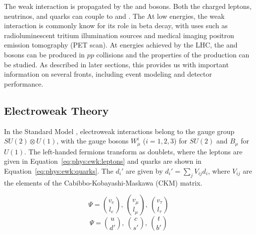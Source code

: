 The weak interaction is propagated by the \W and \Z bosons. Both the charged leptons, neutrinos, and quarks can couple to \W and \Z.  The At low energies, the weak interaction is commonly know for its role in beta decay, with uses such as radioluminescent tritium illumination sources and medical imaging positron emission tomography (PET scan).  At energies achieved by the LHC, the \W and \Z bosons can be produced in $pp$ collisions and the properties of the production can be studied. As described in later sections, this provides us with important information on several fronts, including event modeling and detector performance.


\subsection{Electroweak Theory}\label{ch:sm:ewk}
In the Standard Model \cite{SMEWK1,SMEWK2,SMEWK3}, electroweak interactions belong to the gauge group $SU(2) \otimes U(1)$, with the gauge bosons $W_{\mu}^i$ ($i = 1,2,3$) for $SU(2)$ and  $B_{\mu}$ for $U(1)$.  The left-handed fermions transform as doublets, where the leptons are given in Equation~\ref{eq:phys:ewk:leptons} and quarks are shown in Equation~\ref{eq:phys:ewk:quarks}. The $d_i'$ are given by $d_i' = \sum_j V_{ij} d_i$, where $V_{ij}$ are the elements of the Cabibbo-Kobayashi-Maskawa (CKM) matrix\cite{ckm1,ckm2}.

\begin{equation}
  \Psi=\binom{v_e}{l_e},~\binom{v_{\mu}}{l_{\mu}},~\binom{v_{\tau}}{l_{\tau}}
  \label{eq:phys:ewk:leptons}
\end{equation}
\begin{equation}
  \Psi=\binom{u}{d'},~\binom{c}{s'},~\binom{t}{b'}
  \label{eq:phys:ewk:quarks}
\end{equation}




